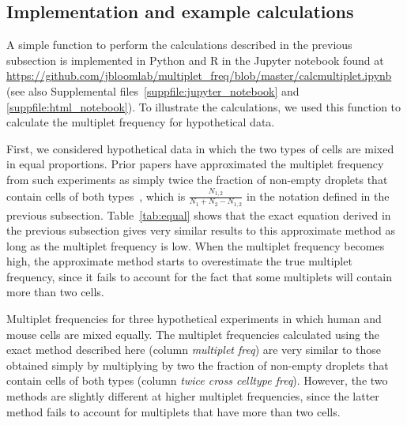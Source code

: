 \documentclass[fleqn,10pt,lineno]{wlpeerj} %
\begin{document}
\subsection*{Implementation and example calculations}
A simple function to perform the calculations described in the previous subsection is implemented in Python and R in the Jupyter notebook found at
\url{https://github.com/jbloomlab/multiplet_freq/blob/master/calcmultiplet.ipynb} (see also Supplemental files~\ref{suppfile:jupyter_notebook} and \ref{suppfile:html_notebook}).
To illustrate the calculations, we used this function to calculate the multiplet frequency for hypothetical data.

First, we considered hypothetical data in which the two types of cells are mixed in equal proportions.
Prior papers have approximated the multiplet frequency from such experiments as simply twice the fraction of non-empty droplets that contain cells of both types~\citep{klein2015droplet,macosko2015highly,zheng2017massively,cao2017comprehensive}, which is $\frac{N_{1,2}}{N_1 + N_2 - N_{1,2}}$ in the notation defined in the previous subsection. 
Table~\ref{tab:equal} shows that the exact equation derived in the previous subsection gives very similar results to this approximate method as long as the multiplet frequency is low.
When the multiplet frequency becomes high, the approximate method starts to overestimate the true multiplet frequency, since it fails to account for the fact that some multiplets will contain more than two cells.

\begin{table}[b]
\centering

\caption{\label{tab:equal}
Multiplet frequencies for three hypothetical experiments in which human and mouse cells are mixed equally.
The multiplet frequencies calculated using the exact method described here (column \emph{multiplet freq}) are very similar to those obtained simply by multiplying by two the fraction of non-empty droplets that contain cells of both types (column \emph{twice cross celltype freq}).
However, the two methods are slightly different at higher multiplet frequencies, since the latter method fails to account for multiplets that have more than two cells.}
\end{table}
\end{document}
